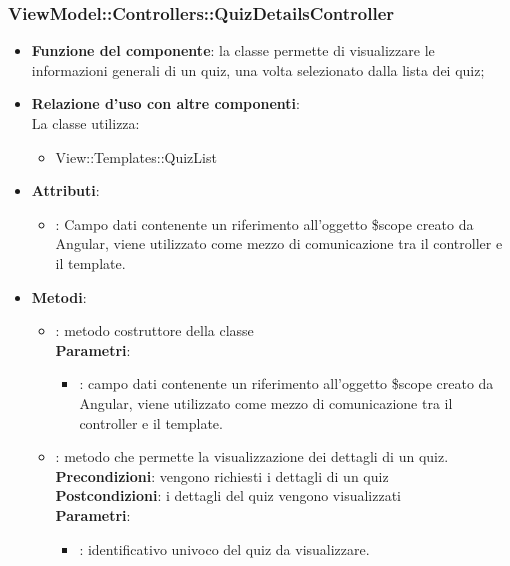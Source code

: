 \subsubsection{ViewModel::Controllers::QuizDetailsController}
\begin{itemize}
\item\textbf{Funzione del componente}: la classe permette di visualizzare le informazioni generali di un quiz, una volta selezionato dalla lista dei quiz;
	\item\textbf{Relazione d'uso con altre componenti}: \\
La classe utilizza:
	\begin{itemize}
		\item View::Templates::QuizList
	\end{itemize}
\item\textbf{Attributi}:
	\begin{itemize}
		\item{}: Campo dati contenente un riferimento all'oggetto \$scope creato da Angular, viene utilizzato come mezzo di comunicazione tra il controller e il template.\\
	\end{itemize}
\item\textbf{Metodi}:
	\begin{itemize}
		\item{}: metodo costruttore della classe\\
		\textbf{Parametri}:
			\begin{itemize}
				\item{}: campo dati contenente un riferimento all’oggetto \$scope creato da Angular, viene utilizzato come mezzo di comunicazione tra il controller e il template.\\
			\end{itemize}
		\item{}: metodo che permette la visualizzazione dei dettagli di un quiz.\\
		\textbf{Precondizioni}: vengono richiesti i dettagli di un quiz\\
		\textbf{Postcondizioni}: i dettagli del quiz vengono visualizzati\\
		\textbf{Parametri}:
			\begin{itemize}
				\item{}: identificativo univoco del quiz da visualizzare.\\
			\end{itemize}
	\end{itemize}
\end{itemize}

